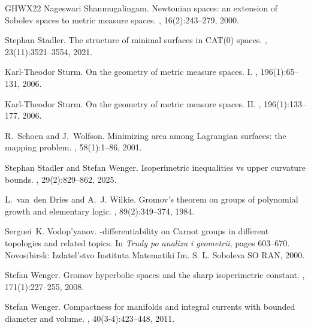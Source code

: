 \documentclass[a4paper,leqno]{amsart}
\numberwithin{equation}{section}
\theoremstyle{remark}
\theoremstyle{remark}
\begin{document}
\begin{thebibliography}{GHWX22}
Nageswari Shanmugalingam.
\newblock Newtonian spaces: an extension of {S}obolev spaces to metric measure spaces.
, 16(2):243--279, 2000.

Stephan Stadler.
\newblock The structure of minimal surfaces in {CAT}(0) spaces.
, 23(11):3521--3554, 2021.

Karl-Theodor Sturm.
\newblock On the geometry of metric measure spaces. {I}.
, 196(1):65--131, 2006.

Karl-Theodor Sturm.
\newblock On the geometry of metric measure spaces. {II}.
, 196(1):133--177, 2006.

R.~Schoen and J.~Wolfson.
\newblock Minimizing area among {L}agrangian surfaces: the mapping problem.
, 58(1):1--86, 2001.

Stephan Stadler and Stefan Wenger.
\newblock Isoperimetric inequalities vs upper curvature bounds.
, 29(2):829--862, 2025.

L.~van~den Dries and A.~J. Wilkie.
\newblock Gromov's theorem on groups of polynomial growth and elementary logic.
, 89(2):349--374, 1984.

Serguei~K. Vodop'yanov.
-differentiability on {Carnot} groups in different topologies and related topics.
\newblock In {\em Trudy po analizu i geometrii}, pages 603--670. Novosibirsk: Izdatel'stvo Instituta Matematiki Im. S. L. Soboleva SO RAN, 2000.

Stefan Wenger.
\newblock Gromov hyperbolic spaces and the sharp isoperimetric constant.
, 171(1):227--255, 2008.

Stefan Wenger.
\newblock Compactness for manifolds and integral currents with bounded diameter and volume.
, 40(3-4):423--448, 2011.


\end{thebibliography}
\end{document}
